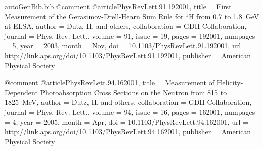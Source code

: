 \begin{filecontents*}{autoGenBib.bib}
@comment %
@article{PhysRevLett.91.192001,
  title = {First Measurement of the Gerasimov-Drell-Hearn Sum Rule for $^{1}\mathrm{H}$ from 0.7 to 1.8~GeV at ELSA},
  author = {Dutz, H. and others},
  collaboration = {GDH Collaboration},
  journal = {Phys. Rev. Lett.},
  volume = {91},
  issue = {19},
  pages = {192001},
  numpages = {5},
  year = {2003},
  month = {Nov},
  doi = {10.1103/PhysRevLett.91.192001},
  url = {http://link.aps.org/doi/10.1103/PhysRevLett.91.192001},
  publisher = {American Physical Society}
}

@comment %
@article{PhysRevLett.94.162001,
  title = {Measurement of Helicity-Dependent Photoabsorption Cross Sections on the Neutron from 815 to 1825~MeV},
  author = {Dutz, H. and others},
  collaboration = {GDH Collaboration},
  journal = {Phys. Rev. Lett.},
  volume = {94},
  issue = {16},
  pages = {162001},
  numpages = {4},
  year = {2005},
  month = {Apr},
  doi = {10.1103/PhysRevLett.94.162001},
  url = {http://link.aps.org/doi/10.1103/PhysRevLett.94.162001},
  publisher = {American Physical Society}
}


\end{filecontents*}
